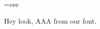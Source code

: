 \documentclass{article}
\begin{document}
\font\myfont=cee

Hey look, {\myfont AAA} from our font.
\end{document}
